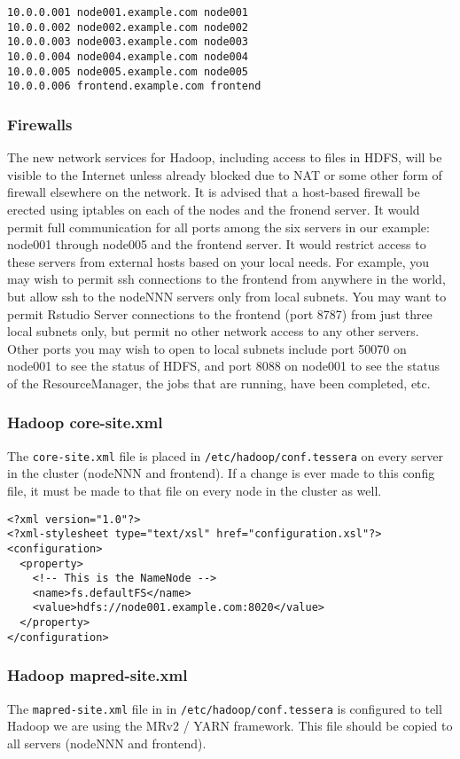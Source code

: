 \begin{verbatim}
10.0.0.001 node001.example.com node001
10.0.0.002 node002.example.com node002
10.0.0.003 node003.example.com node003
10.0.0.004 node004.example.com node004
10.0.0.005 node005.example.com node005
10.0.0.006 frontend.example.com frontend
\end{verbatim}

\subsubsection{Firewalls}
The new network services for Hadoop, including access to files in HDFS,
will be visible to the Internet unless already blocked due to NAT or
some other form of firewall elsewhere on the network.  It is advised
that a host-based firewall be erected using iptables on each of the
nodes and the fronend server.  It would permit full communication for
all ports among the six servers in our example: node001 through node005
and the frontend server.  It would restrict access to these servers
from external hosts based on your local needs.  For example, you may
wish to permit ssh connections to the frontend from anywhere in
the world, but allow ssh to the nodeNNN servers only from local subnets.
You may want to permit Rstudio Server connections to the frontend
(port 8787) from just three local subnets only, but permit no other
network access to any other servers.  Other ports you may wish to open
to local subnets include port 50070 on node001 to see the status of
HDFS, and port 8088 on node001 to see the status of the ResourceManager,
the jobs that are running, have been completed, etc.

\subsubsection{Hadoop core-site.xml}
The \verb|core-site.xml| file is placed in \verb|/etc/hadoop/conf.tessera| on every server in the cluster (nodeNNN and frontend).  If a change is ever made to this config file, it must be made to that file on every node in the cluster as well.
\begin{verbatim}
<?xml version="1.0"?>
<?xml-stylesheet type="text/xsl" href="configuration.xsl"?>
<configuration>
  <property>
    <!-- This is the NameNode -->
    <name>fs.defaultFS</name>
    <value>hdfs://node001.example.com:8020</value>
  </property>
</configuration>
\end{verbatim}


\subsubsection{Hadoop mapred-site.xml}
The \verb|mapred-site.xml| file in in \verb|/etc/hadoop/conf.tessera|
is configured to tell Hadoop we are using the MRv2 / YARN framework.
This file should be copied to all servers (nodeNNN and frontend).

